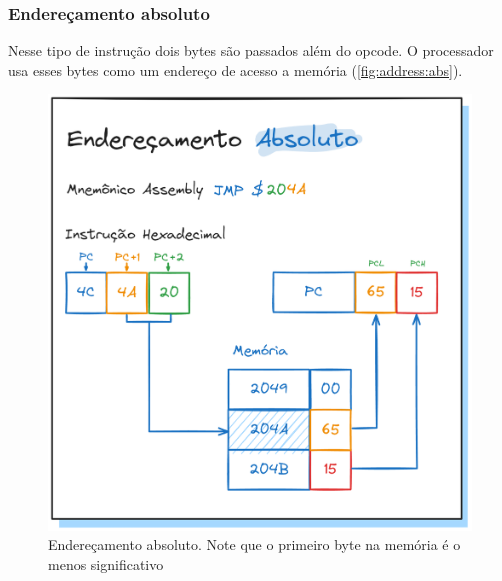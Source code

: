 \documentclass[
	12pt,				  %
	openright,		%
	a4paper,			%
	english,			%
	french,				%
	spanish,			%
	brazil,				%
]{abntex2}
\begin{document}
\subsubsection{Endereçamento absoluto}
Nesse tipo de instrução dois bytes são passados além do opcode. O processador
usa esses bytes como um endereço de acesso a memória (\autoref{fig:address:abs}).
\begin{figure}[h]
	\centering
	\caption{Endereçamento absoluto. Note que o primeiro byte na memória é o menos
		significativo}
	\label{fig:address:abs}
	\includegraphics[scale=0.25]{../assets/img/addressing-modes-abs.png}
\end{figure}
\end{document}
